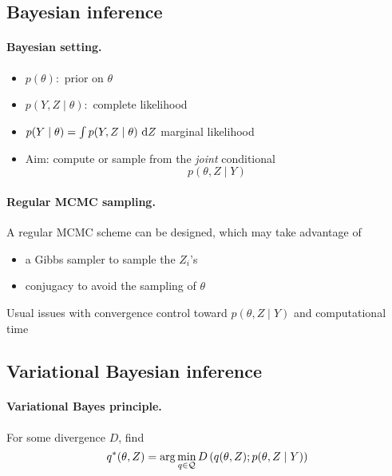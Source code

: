 \subsection{Bayesian inference}

\jump \paragraph{Bayesian setting.}
\begin{itemize}
\item $p(\theta):$ prior on $\theta$
\item $p(Y, Z \mid \theta):$ complete likelihood
\item $p(Y \mid \theta) = \int p(Y, Z \mid \theta) \d Z$ marginal likelihood
\item Aim: compute or sample from the {\sl joint} conditional
$$
p(\theta, Z \mid Y)
$$
\end{itemize}

\jump \paragraph{Regular MCMC sampling.} A regular MCMC scheme can be designed, which may take advantage of 
\begin{itemize}
 \item a Gibbs sampler to sample the $Z_i$'s
 \item conjugacy to avoid the sampling of $\theta$ \citep{MMF13}
\end{itemize}

\ra Usual issues with convergence control toward $p(\theta, Z \mid Y)$  and computational time

\blank 
\subsection{Variational Bayesian inference}

\jump \paragraph{Variational Bayes principle.} For some divergence $D$, find
$$
q^*(\theta, Z) = \arg\min_{q \in \mathcal{Q}} D\left(q(\theta, Z); p(\theta, Z \mid Y)\right)
$$

